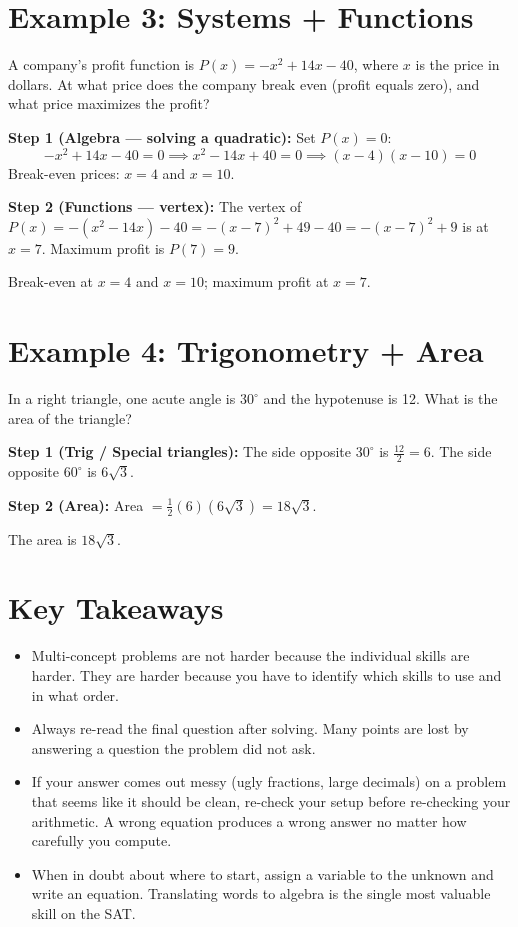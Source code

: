 \documentclass[14pt]{extarticle}
\begin{document}
\section*{Example 3: Systems + Functions}

A company's profit function is \(P(x) = -x^2 + 14x - 40\), where \(x\) is the price in dollars. At what price does the company break even (profit equals zero), and what price maximizes the profit?

\textbf{Step 1 (Algebra --- solving a quadratic):} Set \(P(x) = 0\):
\[
-x^2 + 14x - 40 = 0 \implies x^2 - 14x + 40 = 0 \implies (x - 4)(x - 10) = 0
\]
Break-even prices: \(x = 4\) and \(x = 10\).

\textbf{Step 2 (Functions --- vertex):} The vertex of \(P(x) = -(x^2 - 14x) - 40 = -(x - 7)^2 + 49 - 40 = -(x-7)^2 + 9\) is at \(x = 7\). Maximum profit is \(P(7) = 9\).

Break-even at \(x = \boxed{4}\) and \(x = \boxed{10}\); maximum profit at \(x = \boxed{7}\).

\section*{Example 4: Trigonometry + Area}

In a right triangle, one acute angle is \(30^\circ\) and the hypotenuse is 12. What is the area of the triangle?

\textbf{Step 1 (Trig / Special triangles):} The side opposite \(30^\circ\) is \(\frac{12}{2} = 6\). The side opposite \(60^\circ\) is \(6\sqrt{3}\).

\textbf{Step 2 (Area):} Area \(= \frac{1}{2}(6)(6\sqrt{3}) = 18\sqrt{3}\).

The area is \(\boxed{18\sqrt{3}}\).

\section*{Key Takeaways}
\begin{itemize}
  \item Multi-concept problems are not harder because the individual skills are harder. They are harder because you have to identify which skills to use and in what order.
  \item Always re-read the final question after solving. Many points are lost by answering a question the problem did not ask.
  \item If your answer comes out messy (ugly fractions, large decimals) on a problem that seems like it should be clean, re-check your setup before re-checking your arithmetic. A wrong equation produces a wrong answer no matter how carefully you compute.
  \item When in doubt about where to start, assign a variable to the unknown and write an equation. Translating words to algebra is the single most valuable skill on the SAT.
\end{itemize}
\end{document}
